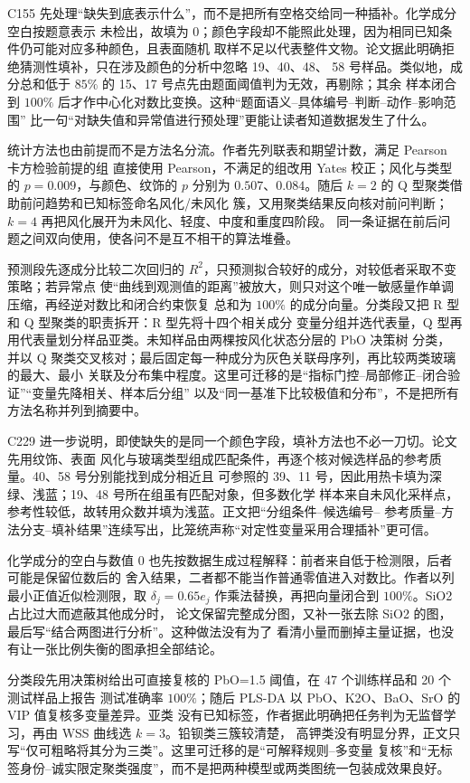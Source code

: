C155 先处理“缺失到底表示什么”，而不是把所有空格交给同一种插补。化学成分空白按题意表示
未检出，故填为 0；颜色字段却不能照此处理，因为相同已知条件仍可能对应多种颜色，且表面随机
取样不足以代表整件文物。论文据此明确拒绝猜测性填补，只在涉及颜色的分析中忽略 19、40、48、
58 号样品。类似地，成分总和低于 $85\%$ 的 15、17 号点先由题面阈值判为无效，再剔除；其余
样本闭合到 $100\%$ 后才作中心化对数比变换。这种“题面语义--具体编号--判断--动作--影响范围”
比一句“对缺失值和异常值进行预处理”更能让读者知道数据发生了什么。

统计方法也由前提而不是方法名分流。作者先列联表和期望计数，满足 Pearson 卡方检验前提的组
直接使用 Pearson，不满足的组改用 Yates 校正；风化与类型的 $p=0.009$，与颜色、纹饰的
$p$ 分别为 $0.507$、$0.084$。随后 $k=2$ 的 Q 型聚类借助前问趋势和已知标签命名风化/未风化
簇，又用聚类结果反向核对前问判断；$k=4$ 再把风化展开为未风化、轻度、中度和重度四阶段。
同一条证据在前后问题之间双向使用，使各问不是互不相干的算法堆叠。

预测段先逐成分比较二次回归的 $R^2$，只预测拟合较好的成分，对较低者采取不变策略；若异常点
使“曲线到观测值的距离”被放大，则只对这个唯一敏感量作单调压缩，再经逆对数比和闭合约束恢复
总和为 $100\%$ 的成分向量。分类段又把 R 型和 Q 型聚类的职责拆开：R 型先将十四个相关成分
变量分组并选代表量，Q 型再用代表量划分样品亚类。未知样品由两棵按风化状态分层的 PbO 决策树
分类，并以 Q 聚类交叉核对；最后固定每一种成分为灰色关联母序列，再比较两类玻璃的最大、最小
关联及分布集中程度。这里可迁移的是“指标门控--局部修正--闭合验证”“变量先降相关、样本后分组”
以及“同一基准下比较极值和分布”，不是把所有方法名称并列到摘要中。

C229 进一步说明，即使缺失的是同一个颜色字段，填补方法也不必一刀切。论文先用纹饰、表面
风化与玻璃类型组成匹配条件，再逐个核对候选样品的参考质量。40、58 号分别能找到成分相近且
可参照的 39、11 号，因此用热卡填为深绿、浅蓝；19、48 号所在组虽有匹配对象，但多数化学
样本来自未风化采样点，参考性较低，故转用众数并填为浅蓝。正文把“分组条件--候选编号--
参考质量--方法分支--填补结果”连续写出，比笼统声称“对定性变量采用合理插补”更可信。

化学成分的空白与数值 0 也先按数据生成过程解释：前者来自低于检测限，后者可能是保留位数后的
舍入结果，二者都不能当作普通零值进入对数比。作者以列最小正值近似检测限，取
$\delta_j=0.65e_j$ 作乘法替换，再把向量闭合到 $100\%$。SiO2 占比过大而遮蔽其他成分时，
论文保留完整成分图，又补一张去除 SiO2 的图，最后写“结合两图进行分析”。这种做法没有为了
看清小量而删掉主量证据，也没有让一张比例失衡的图承担全部结论。

分类段先用决策树给出可直接复核的 PbO=1.5 阈值，在 47 个训练样品和 20 个测试样品上报告
测试准确率 $100\%$；随后 PLS-DA 以 PbO、K2O、BaO、SrO 的 VIP 值复核多变量差异。亚类
没有已知标签，作者据此明确把任务判为无监督学习，再由 WSS 曲线选 $k=3$。铅钡类三簇较清楚，
高钾类没有明显分界，正文只写“仅可粗略将其分为三类”。这里可迁移的是“可解释规则--多变量
复核”和“无标签身份--诚实限定聚类强度”，而不是把两种模型或两类图统一包装成效果良好。


